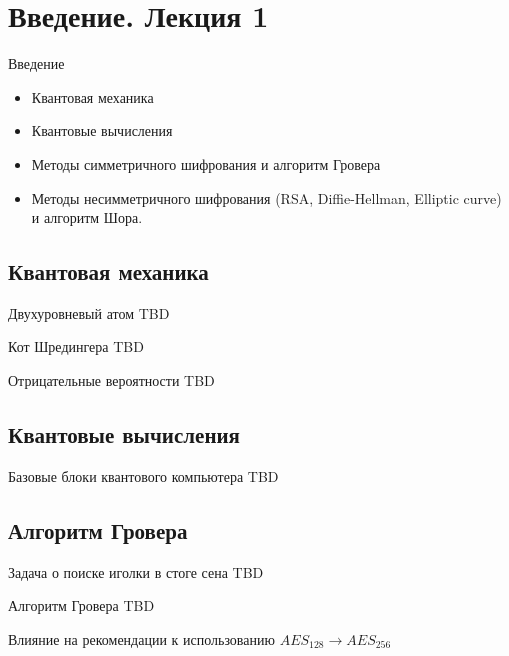 \section{Введение. Лекция 1}

\begin{frame}{Введение}
\begin{itemize}
\item Квантовая механика
\item Квантовые вычисления
\item Методы симметричного шифрования и алгоритм Гровера
\item Методы несимметричного шифрования (RSA, Diffie-Hellman, Elliptic
curve) и алгоритм Шора.
\end{itemize}
\end{frame}

\subsection{Квантовая механика}
\begin{frame}{Двухуровневый атом}
TBD
\end{frame}

\begin{frame}{Кот Шредингера}
TBD
\end{frame}

\begin{frame}{Отрицательные вероятности}
TBD
\end{frame}

\subsection{Квантовые вычисления}
\begin{frame}{Базовые блоки квантового компьютера}
TBD
\end{frame}

\subsection{Алгоритм Гровера}
\begin{frame}{Задача о поиске иголки в стоге сена}
TBD
\end{frame}

\begin{frame}{Алгоритм Гровера}
TBD
\end{frame}

\begin{frame}{Влияние на рекомендации к использованию}
$AES_{128} \rightarrow AES_{256}$
\end{frame}

